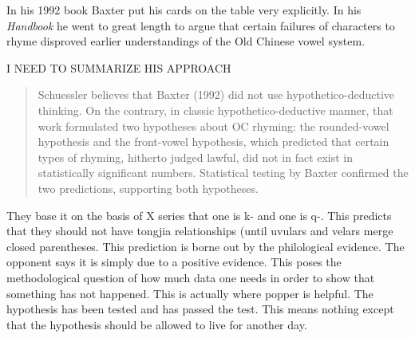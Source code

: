 In his 1992 book Baxter put his cards on the table very explicitly. 
In his \textit{Handbook} he went to great length to argue that certain failures of characters to rhyme disproved earlier understandings of the Old Chinese vowel system. 

I NEED TO SUMMARIZE HIS APPROACH 

\begin{quote}
    Schuessler believes that Baxter (1992) did not use hypothetico-deductive thinking. On the contrary, in classic hypothetico-deductive manner, that work formulated two hypotheses about OC rhyming: the rounded-vowel hypothesis and the front-vowel hypothesis, which predicted that certain types of rhyming, hitherto judged lawful, did not in fact exist in statistically significant numbers. Statistical testing by Baxter confirmed the two predictions, supporting both hypotheses. \citep[]{Baxter2017schuess}
\end{quote}

They base it on the basis of X series that one is k- and one is q-. This predicts that they should not have tongjia relationships (until uvulars and velars merge closed parentheses. This prediction is borne out by the philological evidence. The opponent says it is simply due to a positive evidence. This poses the methodological question of how much data one needs in order to show that something has not happened. This is actually where popper is helpful. The hypothesis has been tested and has passed the test. This means nothing except that the hypothesis should be allowed to live for another day.



